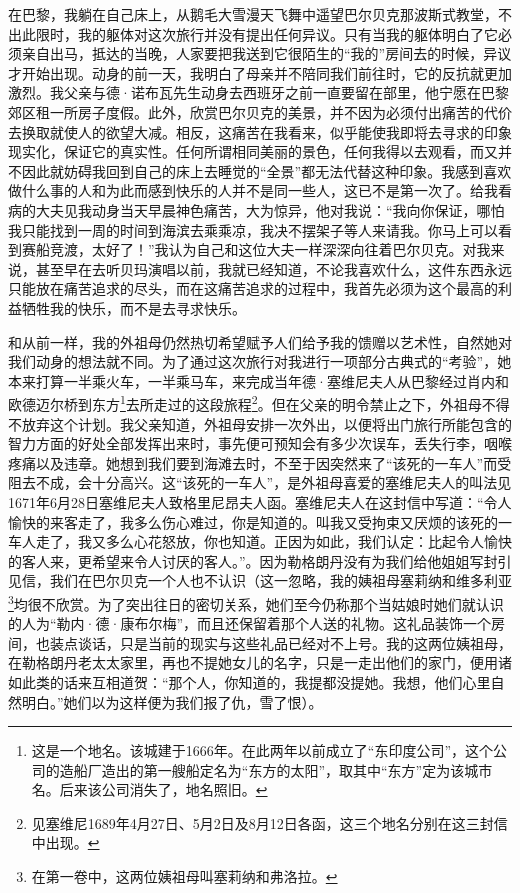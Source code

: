 \par 在巴黎，我躺在自己床上，从鹅毛大雪漫天飞舞中遥望巴尔贝克那波斯式教堂，不出此限时，我的躯体对这次旅行并没有提出任何异议。只有当我的躯体明白了它必须亲自出马，抵达的当晚，人家要把我送到它很陌生的“我的”房间去的时候，异议才开始出现。动身的前一天，我明白了母亲并不陪同我们前往时，它的反抗就更加激烈。我父亲与德·诺布瓦先生动身去西班牙之前一直要留在部里，他宁愿在巴黎郊区租一所房子度假。此外，欣赏巴尔贝克的美景，并不因为必须付出痛苦的代价去换取就使人的欲望大减。相反，这痛苦在我看来，似乎能使我即将去寻求的印象现实化，保证它的真实性。任何所谓相同美丽的景色，任何我得以去观看，而又并不因此就妨碍我回到自己的床上去睡觉的“全景”都无法代替这种印象。我感到喜欢做什么事的人和为此而感到快乐的人并不是同一些人，这已不是第一次了。给我看病的大夫见我动身当天早晨神色痛苦，大为惊异，他对我说：“我向你保证，哪怕我只能找到一周的时间到海滨去乘乘凉，我决不摆架子等人来请我。你马上可以看到赛船竞渡，太好了！”我认为自己和这位大夫一样深深向往着巴尔贝克。对我来说，甚至早在去听贝玛演唱以前，我就已经知道，不论我喜欢什么，这件东西永远只能放在痛苦追求的尽头，而在这痛苦追求的过程中，我首先必须为这个最高的利益牺牲我的快乐，而不是去寻求快乐。
\par 和从前一样，我的外祖母仍然热切希望赋予人们给予我的馈赠以艺术性，自然她对我们动身的想法就不同。为了通过这次旅行对我进行一项部分古典式的“考验”，她本来打算一半乘火车，一半乘马车，来完成当年德·塞维尼夫人从巴黎经过肖内和欧德迈尔桥到东方\footnote{这是一个地名。该城建于1666年。在此两年以前成立了“东印度公司”，这个公司的造船厂造出的第一艘船定名为“东方的太阳”，取其中“东方”定为该城市名。后来该公司消失了，地名照旧。}去所走过的这段旅程\footnote{见塞维尼1689年4月27日、5月2日及8月12日各函，这三个地名分别在这三封信中出现。}。但在父亲的明令禁止之下，外祖母不得不放弃这个计划。我父亲知道，外祖母安排一次外出，以便将出门旅行所能包含的智力方面的好处全部发挥出来时，事先便可预知会有多少次误车，丢失行李，咽喉疼痛以及违章。她想到我们要到海滩去时，不至于因突然来了“该死的一车人”而受阻去不成，会十分高兴。这“该死的一车人”，是外祖母喜爱的塞维尼夫人的叫法见1671年6月28日塞维尼夫人致格里尼昂夫人函。塞维尼夫人在这封信中写道：“令人愉快的来客走了，我多么伤心难过，你是知道的。叫我又受拘束又厌烦的该死的一车人走了，我又多么心花怒放，你也知道。正因为如此，我们认定：比起令人愉快的客人来，更希望来令人讨厌的客人。”。因为勒格朗丹没有为我们给他姐姐写封引见信，我们在巴尔贝克一个人也不认识（这一忽略，我的姨祖母塞莉纳和维多利亚\footnote{在第一卷中，这两位姨祖母叫塞莉纳和弗洛拉。}均很不欣赏。为了突出往日的密切关系，她们至今仍称那个当姑娘时她们就认识的人为“勒内·德·康布尔梅”，而且还保留着那个人送的礼物。这礼品装饰一个房间，也装点谈话，只是当前的现实与这些礼品已经对不上号。我的这两位姨祖母，在勒格朗丹老太太家里，再也不提她女儿的名字，只是一走出他们的家门，便用诸如此类的话来互相道贺：“那个人，你知道的，我提都没提她。我想，他们心里自然明白。”她们以为这样便为我们报了仇，雪了恨）。
